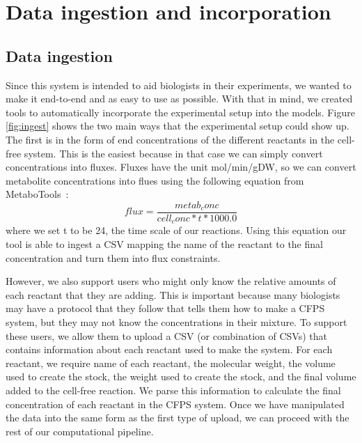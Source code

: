 \section{Data ingestion and incorporation}

\subsection{Data ingestion}
Since this system is intended to aid biologists in their experiments, we wanted to make it end-to-end and as easy to use as possible.
With that in mind, we created tools to automatically incorporate the experimental setup into the models.
Figure \ref{fig:ingest} shows the two main ways that the experimental setup could show up.
The first is in the form of end concentrations of the different reactants in the cell-free system.
This is the easiest because in that case we can simply convert concentrations into fluxes.
Fluxes have the unit mol/min/gDW, so we can convert metabolite concentrations into flues using the following equation from MetaboTools~\cite{aurich2016metabotools}:
\begin{equation}
flux = \frac{metab_conc}{cell_conc * t * 1000.0}
\end{equation}
where we set t to be 24, the time scale of our reactions.
Using this equation our tool is able to ingest a CSV mapping the name of the reactant to the final concentration and turn them into flux constraints.

However, we also support users who might only know the relative amounts of each reactant that they are adding.
This is important because many biologists may have a protocol that they follow that tells them how to make a CFPS system, but they may not know the concentrations in their mixture.
To support these users, we allow them to upload a CSV (or combination of CSVs) that contains information about each reactant used to make the system.
For each reactant, we require name of each reactant, the molecular weight, the volume used to create the stock, the weight used to create the stock, and the final volume added to the cell-free reaction.
We parse this information to calculate the final concentration of each reactant in the CFPS system.
Once we have manipulated the data into the same form as the first type of upload, we can proceed with the rest of our computational pipeline.

